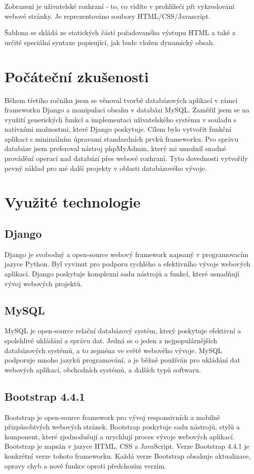 \documentclass[12pt, a4paper,
twoside,        %
openright
]{report}
\begin{document}
Zobrazení je uživatelské rozhraní - to, co vidíte v prohlížeči při vykreslování webové stránky. Je reprezentováno soubory HTML/CSS/Javascript.

Šablona se skládá ze statických částí požadovaného výstupu HTML a také z určité speciální syntaxe popisující, jak bude vložen dynamický obsah.
\section[Počáteční zkušenosti]{Počáteční zkušenosti}
Během třetího ročníku jsem se věnoval tvorbě databázových aplikací v rámci frameworku Django a manipulaci obsahu v databázi MySQL. Zaměřil jsem se na využití generických funkcí a implementaci uživatelského systému v souladu s nativními možnostmi, které Django poskytuje. Cílem bylo vytvořit funkční aplikaci s minimálním úpravami standardních prvků frameworku. Pro správu databáze jsem preferoval nástroj phpMyAdmin, který mi umožnil snadné provádění operací nad databází přes webové rozhraní. Tyto dovednosti vytvořily pevný základ pro mé další projekty v oblasti databázového vývoje.
\section[Využité technologie]{Využité technologie}
	\subsection[Django]{Django} 
	Django je svobodný a open-source webový framework napsaný v programovacím jazyce Python. Byl vyvinut pro podporu rychlého a efektivního vývoje webových aplikací. Django poskytuje komplexní sadu nástrojů a funkcí, které usnadňují vývoj webových projektů.
	\subsection[MySQL]{MySQL}  
	MySQL je open-source relační databázový systém, který poskytuje efektivní a spolehlivé ukládání a správu dat. Jedná se o jeden z nejpopulárnějších databázových systémů, a to zejména ve světě webového vývoje. MySQL podporuje mnoho jazyků programování, a je běžně používán pro ukládání dat webových aplikací, obchodních systémů, a dalších typů softwaru.
	\newpage
	\subsection[Bootstrap 4.4.1]{Bootstrap 4.4.1} 
	Bootstrap je open-source framework pro vývoj responsivních a mobilně přizpůsobivých webových stránek. Bootstrap poskytuje sadu nástrojů, stylů a komponent, které zjednodušují a urychlují proces vývoje webových aplikací. Bootstrap je napsán v jazyce HTML, CSS a JavaScript. Verze Bootstrap 4.4.1 je konkrétní verze tohoto frameworku. Každá verze Bootstrap obsahuje aktualizace, opravy chyb a nové funkce oproti předchozím verzím.
\end{document}

